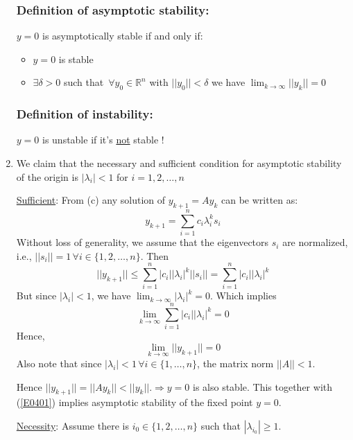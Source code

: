 \documentclass[twoside,10pt,a4paper]{article}
\begin{document}
\begin{enumerate}[label=(\alph*)]
\subsubsection*{Definition of asymptotic stability:}
$y = 0$ is asymptotically stable if and only if:
\begin{itemize}
	\item $y=0$ is stable
	\item $\exists \delta > 0$ such that $\,\forall y_0 \in \mathbb{R}^n$ with $||y_0||<\delta$ we have $\displaystyle \lim_{k \rightarrow \infty} ||y_k|| = 0$	
\end{itemize}

\subsubsection*{Definition of instability:}
$y=0$ is unstable if it's \underline{not} stable !


\item We claim that the necessary and sufficient condition for asymptotic stability of the origin is $|\lambda_i|<1$ for $i=1,2,\ldots , n$

\underline{Sufficient}: From (c) any solution of $y_{k+1} = Ay_k$ can be written as:
\begin{equation*}
	y_{k+1} = \sum_{i=1}^n c_i \lambda_i^k s_i
\end{equation*}
Without loss of generality, we assume that the eigenvectors $s_i$ are normalized, i.e., $||s_i|| = 1 \,\forall i\in\{1,2,\ldots,n\}$. Then
\begin{equation*}
	||y_{k+1}|| \leq \sum_{i=1}^n |c_i||\lambda_i|^k ||s_i|| = \sum_{i=1}^n |c_i||\lambda_i|^k
\end{equation*}
But since $|\lambda_i|<1$, we have $\displaystyle \lim_{k \rightarrow \infty} |\lambda_i|^k = 0$. Which implies
\begin{equation*}
	\lim_{k \rightarrow \infty} \sum_{i=1}^n |c_i||\lambda_i|^k = 0
\end{equation*}
Hence, 
\begin{equation}\label{E0401}
	\lim_{k \rightarrow \infty} ||y_{k+1}||=0
\end{equation}
Also note that since $|\lambda_i|<1 \,\forall i\in \{1,\ldots,n\}$, the matrix norm $||A||<1$.

Hence $||y_{k+1}|| = ||Ay_k|| < ||y_k||. \Longrightarrow y=0$ is also stable. This together with (\ref{E0401}) implies asymptotic stability of the fixed point $y=0$.

\underline{Necessity}: Assume there is $i_0\in\{1,2,\ldots, n\}$ such that $|\lambda_{i_0}| \geq 1$.


\end{enumerate}
\end{document}
